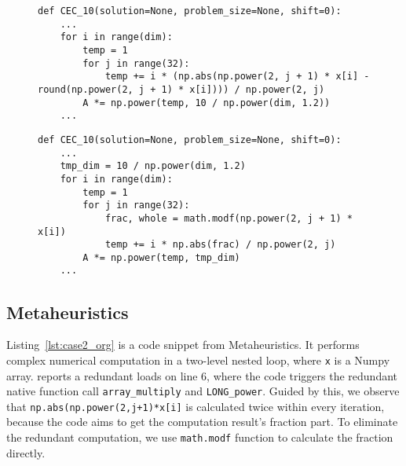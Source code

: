 \begin{figure}[t]
\begin{lstlisting}[caption={Interaction inefficiency in Metaheuristic due to API misuse and loop-invariant computation.},label=lst:case2_org]
def CEC_10(solution=None, problem_size=None, shift=0):
    ...
    for i in range(dim):
        temp = 1
        for j in range(32):
            temp += i * (np.abs(np.power(2, j + 1) * x[i] - round(np.power(2, j + 1) * x[i]))) / np.power(2, j)
        A *= np.power(temp, 10 / np.power(dim, 1.2))
    ...
\end{lstlisting}
\end{figure}

\begin{figure}[t]
\begin{lstlisting}[caption={Optimized code of Listing~\ref{lst:case2_org}, eliminates inefficiencies with an appropriate API and memorization technique.},label=lst:case2_opt]
def CEC_10(solution=None, problem_size=None, shift=0):
    ...
    tmp_dim = 10 / np.power(dim, 1.2)
    for i in range(dim):
        temp = 1
        for j in range(32):
            frac, whole = math.modf(np.power(2, j + 1) * x[i])
            temp += i * np.abs(frac) / np.power(2, j)
        A *= np.power(temp, tmp_dim)
    ...
\end{lstlisting}
\end{figure}













\subsection{Metaheuristics}


\sloppy
Listing~\ref{lst:case2_org} is a code snippet from Metaheuristics. It performs complex numerical computation in a two-level nested loop, where {\tt x} is a Numpy array. \tool reports a redundant loads on line 6, where the code triggers the redundant native function call {\tt array\_multiply} and {\tt LONG\_power}. Guided by this, we observe that {\tt np.abs(np.power(2,j+1)*x[i]} is calculated twice within every iteration, because the code aims to get the computation result's fraction part. To eliminate the redundant computation, we use {\tt math.modf} function to calculate the fraction directly. 


